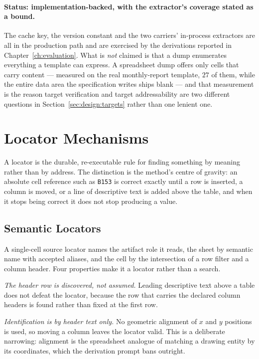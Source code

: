 \paragraph{Status: implementation-backed, with the extractor's coverage stated as a bound.}
The cache key, the version constant and the two carriers' in-process extractors are all in
the production path and are exercised by the derivations reported in
Chapter~\ref{ch:evaluation}. What is \emph{not} claimed is that a dump enumerates everything a
template can express. A spreadsheet dump offers only cells that carry content --- measured on
the real monthly-report template, $27$ of them, while the entire data area the specification
writes ships blank --- and that measurement is the reason target verification and target
addressability are two different questions in Section~\ref{sec:design:targets} rather than one
lenient one.
\section{Locator Mechanisms}
\label{sec:design:locators}

A locator is the durable, re-executable rule for finding something by meaning rather than
by address. The distinction is the method's centre of gravity: an absolute cell reference
such as \texttt{B153} is correct exactly until a row is inserted, a column is moved, or a
line of descriptive text is added above the table, and when it stops being correct it does
not stop producing a value.

\subsection{Semantic Locators}
\label{sec:design:loc:semantic}

A single-cell source locator names the artifact role it reads, the sheet by semantic name
with accepted aliases, and the cell by the intersection of a row filter and a column
header. Four properties make it a locator rather than a search.

\emph{The header row is discovered, not assumed.} Leading descriptive text above a table
does not defeat the locator, because the row that carries the declared column headers is
found rather than fixed at the first row.

\emph{Identification is by header text only.} No geometric alignment of $x$ and $y$
positions is used, so moving a column leaves the locator valid. This is a deliberate
narrowing: alignment is the spreadsheet analogue of matching a drawing entity by its
coordinates, which the derivation prompt bans outright.

